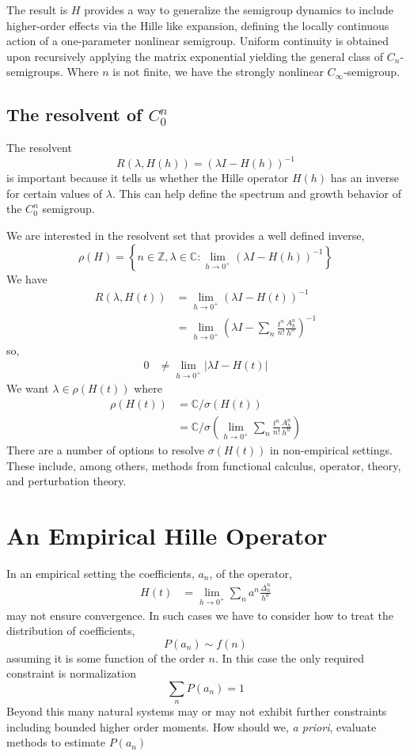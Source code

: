 \documentclass{article}
\newcommand{\Z}{\mathbb{Z}}
\newcommand{\C}{\mathbb{C}}
\begin{document}
The result is $H$ provides a way to generalize the semigroup dynamics to include higher-order effects via the Hille like expansion, defining the locally continuous action of a one-parameter nonlinear semigroup. Uniform continuity is obtained upon recursively applying the matrix exponential yielding the general class of $C_n$-semigroups. Where \( n \) is not finite, we have the strongly nonlinear $C_\infty$-semigroup.


\subsection{The resolvent of $C^n_0$}

The resolvent 
$$
    R(\lambda, H(h)) = (\lambda I - H(h))^{-1}
$$
is important because it tells us whether the Hille operator $H(h)$ has an inverse for certain values of $\lambda$. This can help define the spectrum and growth behavior of the $C^n_0$ semigroup.

We are interested in the resolvent set that provides a well defined inverse,
$$
    \rho(H) = \left\{ n\in\Z, \lambda\in\C: \lim_{h\rightarrow0^+} \left( \lambda I - H(h) \right) ^{-1}\right\}
$$ 
We have
\begin{align*}
     R(\lambda, H(t)) &= \lim_{h\rightarrow0^+}\left( \lambda I - H(t)\right) ^{-1}\\
     &= \lim_{h\rightarrow0^+}\left( \lambda I - \sum_n \frac{t^n}{n!} \frac{A^n_h}{h^n}\right) ^{-1}
\end{align*}
so,
\begin{align*}
     0 &\neq \lim_{h\rightarrow0^+} \left| \lambda I - H(t) \right|
\end{align*}
We want $\lambda \in \rho(H(t))$ where
\begin{align*}
    \rho(H(t)) &=\C /  \sigma\left(H(t)\right)\\
    &= \C /  \sigma\left(\lim_{h\rightarrow0^+} \sum_n \frac{t^n}{n!} \frac{A^n_h}{h^n}\right)
\end{align*}
There are a number of options to resolve $\sigma(H(t))$ in non-empirical settings. These include, among others, methods from functional calculus, operator, theory, and perturbation theory.
\section{An Empirical Hille Operator}
In an empirical setting the coefficients, $a_n$, of the operator,
\begin{align*}
    H(t) &= \lim_{h\rightarrow0^+} \sum_n a^n \frac{\Delta^n_h}{h^n}
\end{align*}
may not ensure convergence. In such cases we have to consider how to treat the distribution of coefficients, 
$$
    P(a_n) \sim f(n)
$$
assuming it is some function of the order $n$. In this case the only required constraint is normalization
$$
\sum_n P(a_n) = 1
$$
Beyond this many natural systems may or may not exhibit further constraints including bounded higher order moments. How should we, \textit{a priori}, evaluate methods to estimate $P(a_n)$ 
\end{document}
